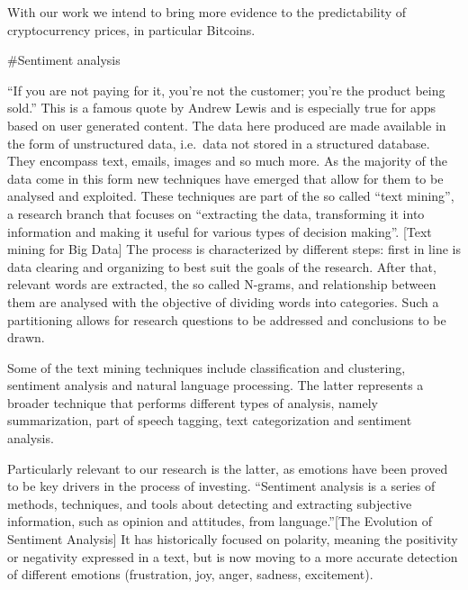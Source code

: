 \documentclass[
]{article}
\begin{document}
With our work we intend to bring more evidence to the predictability of
cryptocurrency prices, in particular Bitcoins.

\#Sentiment analysis

``If you are not paying for it, you're not the customer; you're the
product being sold.'' This is a famous quote by Andrew Lewis and is
especially true for apps based on user generated content. The data here
produced are made available in the form of unstructured data, i.e.~data
not stored in a structured database. They encompass text, emails, images
and so much more. As the majority of the data come in this form new
techniques have emerged that allow for them to be analysed and
exploited. These techniques are part of the so called ``text mining'', a
research branch that focuses on ``extracting the data, transforming it
into information and making it useful for various types of decision
making''. {[}Text mining for Big Data{]} The process is characterized by
different steps: first in line is data clearing and organizing to best
suit the goals of the research. After that, relevant words are
extracted, the so called N-grams, and relationship between them are
analysed with the objective of dividing words into categories. Such a
partitioning allows for research questions to be addressed and
conclusions to be drawn.

Some of the text mining techniques include classification and
clustering, sentiment analysis and natural language processing. The
latter represents a broader technique that performs different types of
analysis, namely summarization, part of speech tagging, text
categorization and sentiment analysis.

Particularly relevant to our research is the latter, as emotions have
been proved to be key drivers in the process of investing. ``Sentiment
analysis is a series of methods, techniques, and tools about detecting
and extracting subjective information, such as opinion and attitudes,
from language.''{[}The Evolution of Sentiment Analysis{]} It has
historically focused on polarity, meaning the positivity or negativity
expressed in a text, but is now moving to a more accurate detection of
different emotions (frustration, joy, anger, sadness, excitement).
\end{document}
